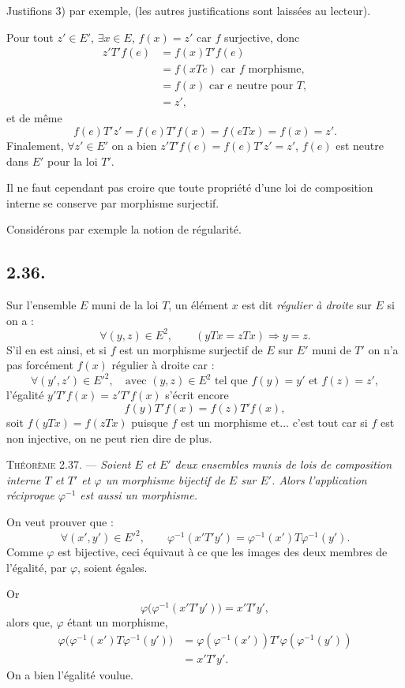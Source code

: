 Justifions 3) par exemple, (les autres justifications sont laissées au lecteur).

Pour tout $z'\in E'$, $\exists x\in E$, $f(x)=z'$ car $f$ surjective, donc
\begin{align*}
z'T'f(e)&=f(x)T'f(e)\\
&=f(xTe)\text{ car }f\text{ morphisme},\\
&=f(x)\text{ car }e\text{ neutre pour }T,\\
&=z',
\end{align*}
et de même
\[
f(e)T'z'=f(e)T'f(x)=f(eTx)=f(x)=z'.
\]
Finalement, $\forall z'\in E'$ on a bien $z'T'f(e)=f(e)T'z'=z'$, $f(e)$ est neutre dans $E'$ pour la loi $T'$.

Il ne faut cependant pas croire que toute propriété d'une loi de composition interne se conserve par morphisme surjectif.

Considérons par exemple la notion de régularité.

\subsection*{2.36.}
Sur l'ensemble $E$ muni de la loi $T$, un élément $x$ est dit \emph{régulier à droite} sur $E$ si on a :
\[
\forall(y,z)\in E^2,\qquad(yTx=zTx)\Rightarrow y=z.
\]
S'il en est ainsi, et si $f$ est un morphisme surjectif de $E$ sur $E'$ muni de $T'$ on n'a pas forcément $f(x)$ régulier à droite car :
\[
\forall(y',z')\in E'^2,\quad\text{avec }(y,z)\in E^2\text{ tel que }f(y)=y'\text{ et }f(z)=z',
\]
l'égalité $y'T'f(x)=z'T'f(x)$ s'écrit encore
\[
f(y)T'f(x)=f(z)T'f(x),
\]
soit $f(yTx)=f(zTx)$ puisque $f$ est un morphisme et... c'est tout car si $f$ est non injective, on ne peut rien dire de plus.

\medskip\noindent\textsc{Théorème 2.37.} --- \emph{Soient $E$ et $E'$ deux ensembles munis de lois de composition interne $T$ et $T'$ et $\varphi$ un morphisme bijectif de $E$ sur $E'$. Alors l'application réciproque $\varphi^{-1}$ est aussi un morphisme.}

On veut prouver que :
\[
\forall(x',y')\in E'^2,\qquad \varphi^{-1}(x'T'y')=\varphi^{-1}(x')T\varphi^{-1}(y').
\]
Comme $\varphi$ est bijective, ceci équivaut à ce que les images des deux membres de l'égalité, par $\varphi$, soient égales.

Or
\[
\varphi\bigl(\varphi^{-1}(x'T'y')\bigr)=x'T'y',
\]
alors que, $\varphi$ étant un morphisme,
\begin{align*}
\varphi\bigl(\varphi^{-1}(x')T\varphi^{-1}(y')\bigr)
&=\varphi(\varphi^{-1}(x'))T'\varphi(\varphi^{-1}(y'))\\
&=x'T'y'.
\end{align*}
On a bien l'égalité voulue. \bookend

